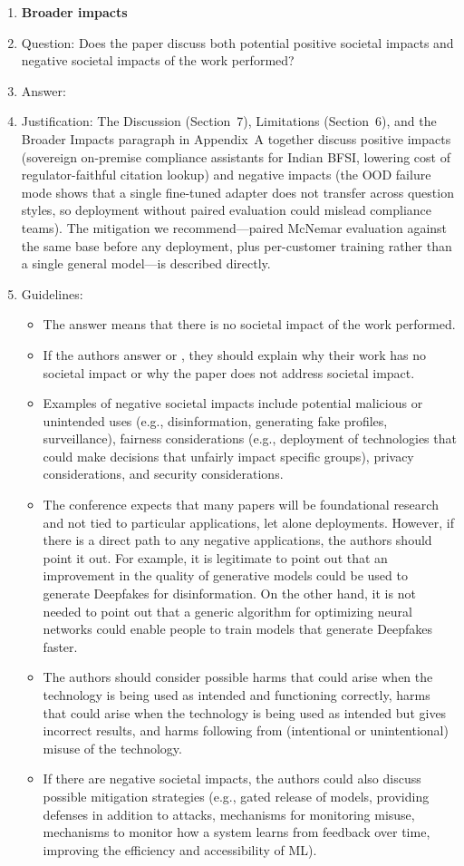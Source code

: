 \begin{enumerate}
\item {\bf Broader impacts}
    \item[] Question: Does the paper discuss both potential positive societal impacts and negative societal impacts of the work performed?
    \item[] Answer: \answerYes{}
    \item[] Justification: The Discussion (Section~7), Limitations (Section~6), and the Broader Impacts paragraph in Appendix~A together discuss positive impacts (sovereign on-premise compliance assistants for Indian BFSI, lowering cost of regulator-faithful citation lookup) and negative impacts (the OOD failure mode shows that a single fine-tuned adapter does not transfer across question styles, so deployment without paired evaluation could mislead compliance teams). The mitigation we recommend---paired McNemar evaluation against the same base before any deployment, plus per-customer training rather than a single general model---is described directly.
    \item[] Guidelines:
    \begin{itemize}
        \item The answer \answerNA{} means that there is no societal impact of the work performed.
        \item If the authors answer \answerNA{} or \answerNo, they should explain why their work has no societal impact or why the paper does not address societal impact.
        \item Examples of negative societal impacts include potential malicious or unintended uses (e.g., disinformation, generating fake profiles, surveillance), fairness considerations (e.g., deployment of technologies that could make decisions that unfairly impact specific groups), privacy considerations, and security considerations.
        \item The conference expects that many papers will be foundational research and not tied to particular applications, let alone deployments. However, if there is a direct path to any negative applications, the authors should point it out. For example, it is legitimate to point out that an improvement in the quality of generative models could be used to generate Deepfakes for disinformation. On the other hand, it is not needed to point out that a generic algorithm for optimizing neural networks could enable people to train models that generate Deepfakes faster.
        \item The authors should consider possible harms that could arise when the technology is being used as intended and functioning correctly, harms that could arise when the technology is being used as intended but gives incorrect results, and harms following from (intentional or unintentional) misuse of the technology.
        \item If there are negative societal impacts, the authors could also discuss possible mitigation strategies (e.g., gated release of models, providing defenses in addition to attacks, mechanisms for monitoring misuse, mechanisms to monitor how a system learns from feedback over time, improving the efficiency and accessibility of ML).
    \end{itemize}


\end{enumerate}
